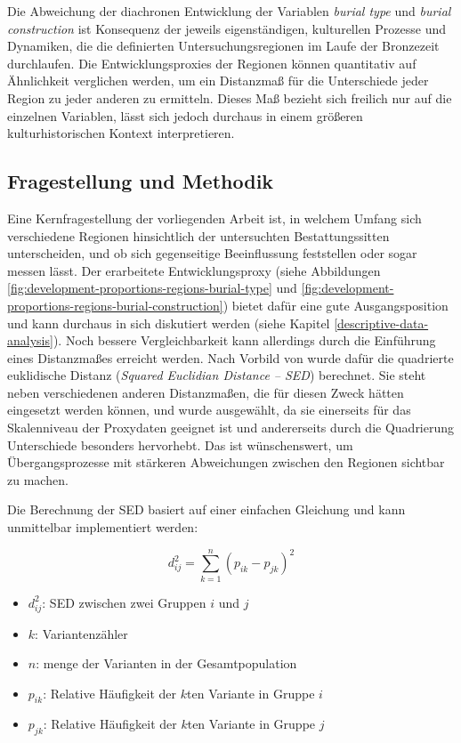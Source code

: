 \documentclass[openany,twoside,twocolumn]{book}
\providecommand{\tightlist}{%
  \setlength{\itemsep}{0pt}\setlength{\parskip}{0pt}}
\begin{document}
Die Abweichung der diachronen Entwicklung der Variablen \emph{burial
type} und \emph{burial construction} ist Konsequenz der jeweils
eigenständigen, kulturellen Prozesse und Dynamiken, die die definierten
Untersuchungsregionen im Laufe der Bronzezeit durchlaufen. Die
Entwicklungsproxies der Regionen können quantitativ auf Ähnlichkeit
verglichen werden, um ein Distanzmaß für die Unterschiede jeder Region
zu jeder anderen zu ermitteln. Dieses Maß bezieht sich freilich nur auf
die einzelnen Variablen, lässt sich jedoch durchaus in einem größeren
kulturhistorischen Kontext interpretieren.

\hypertarget{fragestellung-und-methodik}{%
\subsection{Fragestellung und
Methodik}\label{fragestellung-und-methodik}}

Eine Kernfragestellung der vorliegenden Arbeit ist, in welchem Umfang
sich verschiedene Regionen hinsichtlich der untersuchten
Bestattungssitten unterscheiden, und ob sich gegenseitige Beeinflussung
feststellen oder sogar messen lässt. Der erarbeitete Entwicklungsproxy
(siehe Abbildungen \ref{fig:development-proportions-regions-burial-type}
und \ref{fig:development-proportions-regions-burial-construction})
bietet dafür eine gute Ausgangsposition und kann durchaus in sich
diskutiert werden (siehe Kapitel \ref{descriptive-data-analysis}). Noch
bessere Vergleichbarkeit kann allerdings durch die Einführung eines
Distanzmaßes erreicht werden. Nach Vorbild von
\textcite{neiman_stylistic_1995} wurde dafür die quadrierte euklidische
Distanz (\emph{Squared Euclidian Distance -- SED}) berechnet. Sie steht
neben verschiedenen anderen Distanzmaßen, die für diesen Zweck hätten
eingesetzt werden können, und wurde ausgewählt, da sie einerseits für
das Skalenniveau der Proxydaten geeignet ist und andererseits durch die
Quadrierung Unterschiede besonders hervorhebt. Das ist wünschenswert, um
Übergangsprozesse mit stärkeren Abweichungen zwischen den Regionen
sichtbar zu machen.

Die Berechnung der SED basiert auf einer einfachen Gleichung und kann
unmittelbar implementiert werden:

\[d_{ij}^2 = \sum_{k = 1}^{n} (p_{ik} - p_{jk})^2\]

\begin{itemize}
\tightlist
\item
  \(d_{ij}^2\): SED zwischen zwei Gruppen \(i\) und \(j\)
\item
  \(k\): Variantenzähler
\item
  \(n\): menge der Varianten in der Gesamtpopulation
\item
  \(p_{ik}\): Relative Häufigkeit der \(k\)ten Variante in Gruppe \(i\)
\item
  \(p_{jk}\): Relative Häufigkeit der \(k\)ten Variante in Gruppe \(j\)
\end{itemize}
\end{document}
